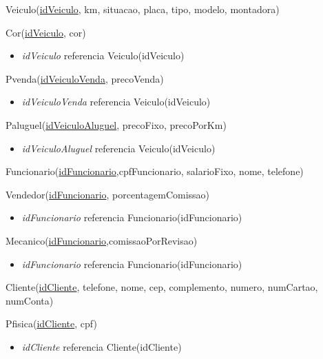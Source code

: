 \documentclass[brazil, a4paper,12pt]{article}
\begin{document}
Veiculo(\underline{idVeiculo}, km, situacao, placa, tipo, modelo, montadora)

\vspace{1cm}

Cor(\underline{idVeiculo}, cor)
\begin{itemize}
\item \emph{idVeiculo} referencia Veiculo(idVeiculo)
\end{itemize}
\vspace{1cm}

Pvenda(\underline{idVeiculoVenda}, precoVenda)
\begin{itemize}
\item \emph{idVeiculoVenda} referencia Veiculo(idVeiculo)
\end{itemize}

\vspace{1cm}

Paluguel(\underline{idVeiculoAluguel}, precoFixo, precoPorKm)
\begin{itemize}
\item \emph{idVeiculoAluguel} referencia Veiculo(idVeiculo)
\end{itemize}

\vspace{1cm}

Funcionario(\underline{idFuncionario},cpfFuncionario, salarioFixo, nome, telefone)

\vspace{1cm}

Vendedor(\underline{idFuncionario}, porcentagemComissao)
\begin{itemize}
\item \emph{idFuncionario} referencia Funcionario(idFuncionario)
\end{itemize}

\vspace{1cm}

Mecanico(\underline{idFuncionario},comissaoPorRevisao)
\begin{itemize}
\item \emph{idFuncionario} referencia Funcionario(idFuncionario)
\end{itemize}

\vspace{1cm}

Cliente(\underline{idCliente}, telefone, nome, cep, complemento, numero, numCartao, numConta)

\vspace{1cm}

Pfisica(\underline{idCliente}, cpf)
\begin{itemize}
\item \emph{idCliente} referencia Cliente(idCliente)
\end{itemize}
\end{document}
